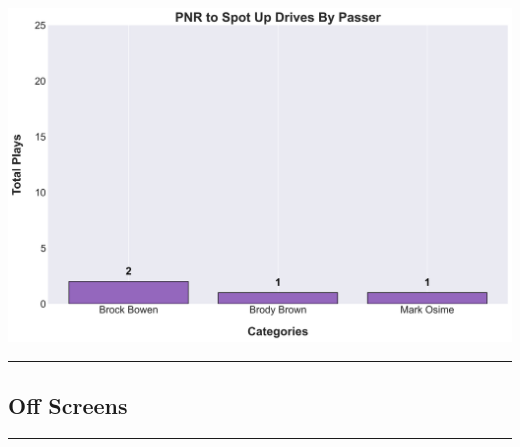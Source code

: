 \documentclass[a4paper,12pt]{article}
\begin{document}
\begin{table}[H]
{\begin{minipage}[t]{0.6\textwidth}
{\begin{tabular}
                
            
                
            

            \bottomrule
        \end{tabular}
        } %
    \end{minipage}
    } %
    \hfill %
    \begin{minipage}[c]{0.35\textwidth} %
        \flushright
        \includegraphics[width=\textwidth, height=.14\textheight]{images/SpotUp_PnrDrivesPlayer_Freq.png} %
    \end{minipage}
\end{table}

\vspace{-1em} %
\hrule height 1pt width 1\textwidth %
\vspace{1em} %











\subsection{Off Screens}

\vspace{1em} %
\hrule height 1pt width 1\textwidth %
\vspace{1em} %
\end{document}
